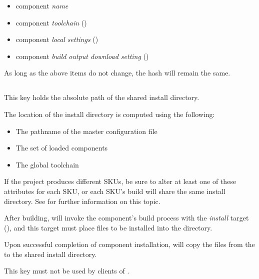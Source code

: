 \begin{itemize}
\item component \emph{name}
\item component \emph{toolchain} ()
\item component \emph{local settings} ()
\item component \emph{build output download setting}
  ()
\end{itemize}

As long as the above items do not change, the hash will remain the
same.

\subsection{}\label{variables:install-directory}

This key holds the absolute path of the shared install directory.

The location of the install directory is computed using the following:

\begin{itemize}
\item{The pathname of the master configuration file}
\item{The set of loaded components}
\item{The global toolchain}
\end{itemize}

If the project produces different SKUs, be sure to alter at least one
of these attributes for each SKU, or each SKU's build will share the
same install directory.  See  for further
information on this topic.

After building, \lmsbw will invoke the component's build process with
the \emph{install} target (), and this
target must place files to be installed into the \destdir directory.

Upon successful completion of component installation, \lmsbw will copy
the files from the \destdir to the shared install directory.

This key must not be used by clients of \lmsbw.


\subsection{}\label{variables:install-target}

